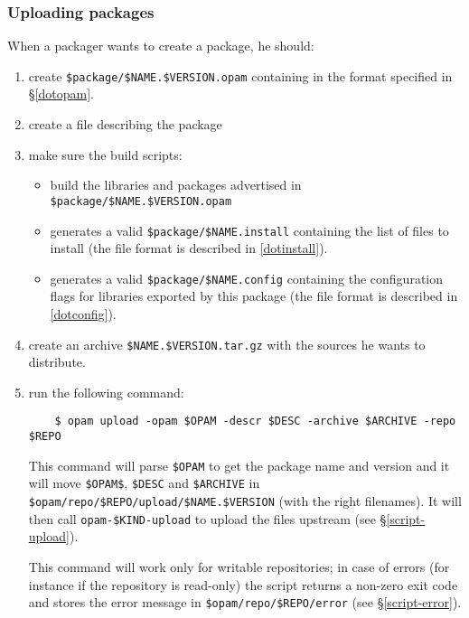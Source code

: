 \documentclass[a4paper,11pt]{article}
\begin{document}
\subsubsection{Uploading packages}
\label{opam-upload}

When a packager wants to create a package, he should:

\begin{enumerate}

\item create \verb+$package/$NAME.$VERSION.opam+ containing in the format
  specified in \S\ref{dotopam}.

\item create a file describing the package

\item make sure the build scripts:
\begin{itemize}
\item build the libraries and packages advertised in
  \verb+$package/$NAME.$VERSION.opam+
\item generates a valid \verb+$package/$NAME.install+ containing the
  list of files to install (the file format is described in
  \ref{dotinstall}).
\item generates a valid \verb+$package/$NAME.config+ containing the
  configuration flags for libraries exported by this package (the file
  format is described in \ref{dotconfig}).
\end{itemize}

\item create an archive \verb+$NAME.$VERSION.tar.gz+ with the sources he
  wants to distribute.

\item run the following command:

\begin{verbatim}
    $ opam upload -opam $OPAM -descr $DESC -archive $ARCHIVE -repo $REPO
\end{verbatim}

This command will parse \verb+$OPAM+ to get the package name and
version and it will move \verb+$OPAM$+, \verb+$DESC+ and
\verb+$ARCHIVE+ in \verb+$opam/repo/$REPO/upload/$NAME.$VERSION+ (with
the right filenames). It will then call \verb+opam-$KIND-upload+ to
upload the files upstream (see \S\ref{script-upload}).

This command will work only for writable repositories; in case of
errors (for instance if the repository is read-only) the script
returns a non-zero exit code and stores the error message in
\verb+$opam/repo/$REPO/error+ (see \S\ref{script-error}).

\end{enumerate}
\end{document}
